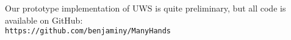\documentclass{sig-alternate-hotpets}
\begin{document}
Our prototype implementation of UWS is quite preliminary, but all code is available on GitHub:\\
\texttt{https://github.com/benjaminy/ManyHands}









% 
%

\balancecolumns
\end{document}
